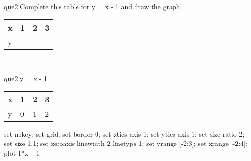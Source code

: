 \documentclass[13.5pt, varwidth=true]{beamer}
\begin{document}
\begin{frame}[shrink=19,fragile]
	\begin{beamercolorbox}[rounded=true, left, shadow=true,wd=14.8cm]{que2}
		 Complete this table for y = x - 1 and draw the graph. \\[0.3cm] \renewcommand{\arraystretch}{1.2}\begin{tabular}{|C|C|C|C|} \hline x & 1 & 2 & 3 \\ \hline y & & & \\ \hline \end{tabular}\\[0.3cm]
	\end{beamercolorbox}
\end{frame}
\begin{frame}[shrink=19,fragile]
	\begin{beamercolorbox}[rounded=true, left, shadow=true,wd=14.8cm]{que2}
		y = x - 1\renewcommand{\arraystretch}{1.2}\begin{tabular}{|C|C|C|C|} \hline x & 1 & 2 & 3 \\ \hline y & 0 & 1 & 2\\ \hline \end{tabular}\begin{gnuplot}[terminal=pdf] set nokey; set grid; set border 0; set xtics axis 1; set ytics axis 1; set size ratio 2; set size 1,1; set zeroaxis linewidth 2 linetype 1; set yrange [-2:3]; set xrange [-2:4]; plot 1*x+-1 \end{gnuplot}
	\end{beamercolorbox}
\end{frame}
\end{document}
